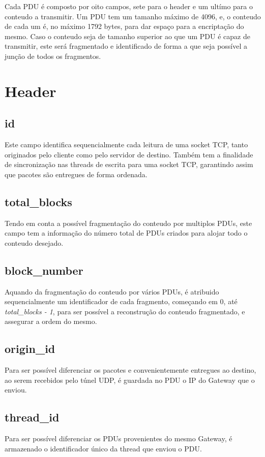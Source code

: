 \documentclass[a4paper]{report}
\begin{document}
Cada PDU é composto por oito campos, sete para o header e um ultímo
para o conteudo a transmitir. Um PDU tem um tamanho máximo de 4096,
e, o conteudo de cada um é, no máximo 1792 bytes, para dar espaço
para a encriptação do mesmo. Caso o conteudo seja de tamanho 
superior ao que um PDU é capaz de transmitir, este será fragmentado
e identificado de forma a que seja possível a junção de todos os
fragmentos.

\section{Header}

\subsection{id}
Este campo identifica sequencialmente cada leitura de uma socket TCP,
tanto originados pelo cliente como pelo servidor de destino. Também 
tem a finalidade de sincronização nas threads de escrita para uma
socket TCP, garantindo assim que pacotes são entregues de forma ordenada.

\subsection{total_blocks}
Tendo em conta a possível fragmentação do conteudo por multiplos PDUs,
este campo tem a informação do número total de PDUs criados para alojar
todo o conteudo desejado.

\subsection{block_number}
Aquando da fragmentação do conteudo por vários PDUs, é atribuido sequencialmente
um identificador de cada fragmento, começando em 0, até \textit{total_blocks
- 1}, para ser possível a reconstrução do conteudo fragmentado, e assegurar
a ordem do mesmo.

\subsection{origin_id}
Para ser possível diferenciar os pacotes e convenientemente entregues ao 
destino, ao serem recebidos pelo túnel UDP, é guardada no PDU o IP do 
Gateway que o enviou.

\subsection{thread_id}
Para ser possível diferenciar os PDUs provenientes do mesmo Gateway,
é armazenado o identificador único da thread que enviou o PDU.
\end{document}
